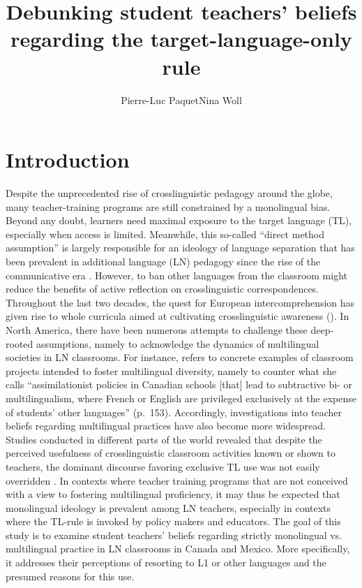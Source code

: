 \documentclass[output=paper]{../langscibook}
\author{Pierre-Luc Paquet\affiliation{University of Texas at Tyler}\lastand Nina Woll\affiliation{University of Quebec at Trois-Rivieres}}
\title{Debunking student teachers’ beliefs regarding the target-language-only rule}
\begin{document}
\maketitle
{}


\section{Introduction}


Despite the unprecedented rise of crosslinguistic pedagogy around the globe, many teacher-training programs are still constrained by a monolingual bias. Beyond any doubt, learners need maximal exposure to the target language (TL), especially when access is limited. Meanwhile, this so-called “direct method assumption” is largely responsible for an ideology of language separation that has been prevalent in additional language (LN) pedagogy since the rise of the communicative era \citep{Cummins2007}. However, to ban other languages from the classroom might reduce the benefits of active reflection on crosslinguistic correspondences. Throughout the last two decades, the quest for European intercomprehension has given rise to whole curricula aimed at cultivating crosslinguistic awareness (\citealt{CouncilOfEurope2001}). In North America, there have been numerous attempts to challenge these deep-rooted assumptions, namely to acknowledge the dynamics of multilingual societies in LN classrooms. For instance, \citet{Duff2007} refers to concrete examples of classroom projects intended to foster multilingual diversity, namely to counter what she calls “assimilationist policies in Canadian schools [that] lead to subtractive bi- or multilingualism, where French or English are privileged exclusively at the expense of students’ other languages” (p.~153). Accordingly, investigations into teacher beliefs regarding multilingual practices have also become more widespread. Studies conducted in different parts of the world revealed that despite the perceived usefulness of crosslinguistic classroom activities known or shown to teachers, the dominant discourse favoring exclusive TL use was not easily overridden \citep{ArocenaEgañaEtAl2015,Haukås2016,MartinezEtAl2015}. In contexts where teacher training programs that are not conceived with a view to fostering multilingual proficiency, it may thus be expected that monolingual ideology is prevalent among LN teachers, especially in contexts where the TL-rule is invoked by policy makers and educators. The goal of this study is to examine student teachers’ beliefs regarding strictly monolingual vs. multilingual practice in LN classrooms in Canada and Mexico. More specifically, it addresses their perceptions of resorting to L1 or other languages and the presumed reasons for this use.
\end{document}
